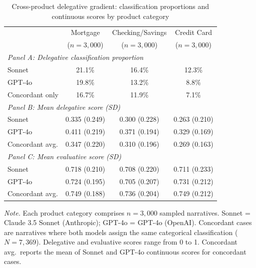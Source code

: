 \begin{table}[htbp]
\centering
\small
\caption{Cross-product delegative gradient: classification proportions and continuous scores by product category}
\label{tab:cfpb_gradient}
\begin{tabular}{lccc}
\toprule
 & Mortgage & Checking/Savings & Credit Card \\
 & ($n = 3{,}000$) & ($n = 3{,}000$) & ($n = 3{,}000$) \\
\midrule
\multicolumn{4}{l}{\textit{Panel A: Delegative classification proportion}} \\[3pt]
Sonnet       & 21.1\% & 16.4\% & 12.3\% \\
GPT-4o       & 19.8\% & 13.2\% & 8.8\%  \\
Concordant only & 16.7\% & 11.9\% & 7.1\% \\[6pt]
\multicolumn{4}{l}{\textit{Panel B: Mean delegative score (SD)}} \\[3pt]
Sonnet       & 0.335 (0.249) & 0.300 (0.228) & 0.263 (0.210) \\
GPT-4o       & 0.411 (0.219) & 0.371 (0.194) & 0.329 (0.169) \\
Concordant avg. & 0.347 (0.220) & 0.310 (0.196) & 0.269 (0.163) \\[6pt]
\multicolumn{4}{l}{\textit{Panel C: Mean evaluative score (SD)}} \\[3pt]
Sonnet       & 0.718 (0.210) & 0.708 (0.220) & 0.711 (0.233) \\
GPT-4o       & 0.724 (0.195) & 0.705 (0.207) & 0.731 (0.212) \\
Concordant avg. & 0.749 (0.188) & 0.736 (0.204) & 0.749 (0.212) \\
\bottomrule
\end{tabular}
\begin{flushleft}
\footnotesize
\textit{Note.} Each product category comprises $n = 3{,}000$ sampled narratives. Sonnet = Claude 3.5 Sonnet (Anthropic); GPT-4o = GPT-4o (OpenAI). Concordant cases are narratives where both models assign the same categorical classification ($N = 7{,}369$). Delegative and evaluative scores range from 0 to 1. Concordant avg.\ reports the mean of Sonnet and GPT-4o continuous scores for concordant cases.
\end{flushleft}
\end{table}
